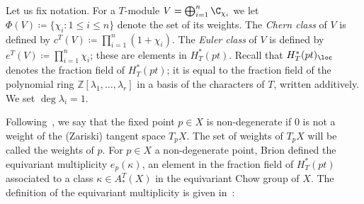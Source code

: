 Let us fix notation. For a $T$-module $V = \bigoplus_{i=1}^n \C_{\chi_i}$ we let \mbox{$\Phi(V) \coloneqq \{ \chi_i : 1 \le i \le n\}$} denote the set of its weights. The {\em Chern class} of $V$ is defined by $c^T(V) \coloneqq  \prod_{i=1}^n (1+ \chi_i)$. 
The {\em Euler class} of $V$ is defined by $e^T(V) \coloneqq  \prod_{i=1}^n \chi_i$; these 
are elements in $H^*_T(pt)$. Recall that $H^*_T(pt)_{\loc} $ 
denotes the fraction field of $H^*_T(pt)$; it is equal to the fraction field 
	of the polynomial ring $\mathbb{Z}[\lambda_1, \ldots , \lambda_r]$ in a basis of the characters 
	of $T$, written additively. We set $\deg \lambda_i =1$.


Following~\cite[\S 4]{brion:eq-chow}, we say that the fixed point $p \in X$ is non-degenerate if $0$ is not a weight
of the (Zariski) tangent space $T_p X$. The set of weights of $T_p X$ will be called the weights of $p$. 
For $p \in X$ a non-degenerate point, Brion defined
	the equivariant 
	multiplicity $e_p(\kappa)$, an element in the fraction field of $H^*_T(pt)$ associated 
	to a class $\kappa \in A_*^T(X)$ in the equivariant Chow group of $X$.
The definition of the equivariant multiplicity is given in~\cite[\S 4.2]{brion:eq-chow}:

